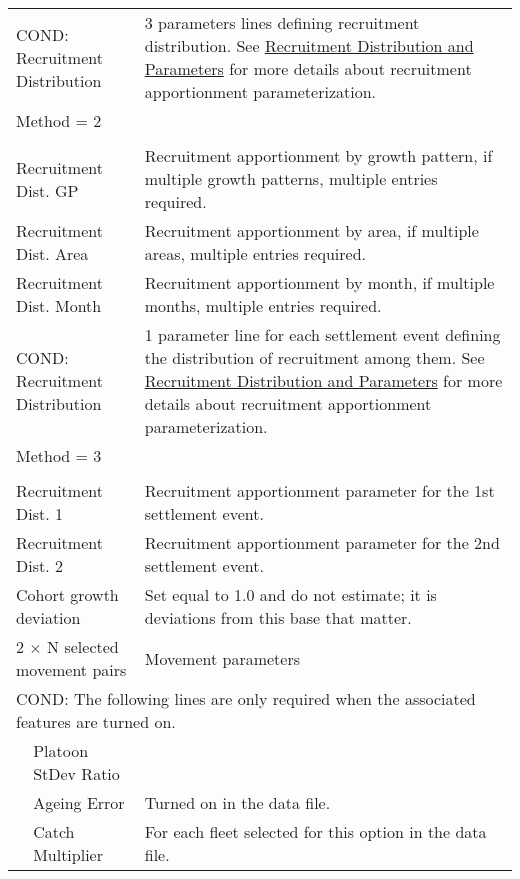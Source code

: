 \begin{longtable}{p{1cm} p{2.25cm} p{10cm}}
	\multicolumn{2}{l}{COND: Recruitment Distribution} \Tstrut & 3 parameters lines defining recruitment distribution. See \hyperlink{recdist}{Recruitment Distribution and Parameters} for more details about recruitment apportionment parameterization. \\
	\multicolumn{2}{l}{Method = 2} \Tstrut & \\
	& & \\
	\multicolumn{2}{l}{Recruitment Dist. GP} \Tstrut & Recruitment apportionment by growth pattern, if multiple growth patterns, multiple entries required. \\
	\multicolumn{2}{l}{Recruitment Dist. Area} & Recruitment apportionment by area, if multiple areas, multiple entries required. \\
	\multicolumn{2}{l}{Recruitment Dist. Month} & Recruitment apportionment by month, if multiple months, multiple entries required. \Bstrut\\
	\hline

	\multicolumn{2}{l}{COND: Recruitment Distribution} \Tstrut & 1 parameter line for each settlement event defining the distribution of recruitment among them. See \hyperlink{recdist}{Recruitment Distribution and Parameters} for more details about recruitment apportionment parameterization. \\
	\multicolumn{2}{l}{Method = 3} \Tstrut & \\
	& & \\
	\multicolumn{2}{l}{Recruitment Dist. 1} \Tstrut & Recruitment apportionment parameter for the 1st settlement event. \\
	\multicolumn{2}{l}{Recruitment Dist. 2} & Recruitment apportionment parameter for the 2nd settlement event. \Bstrut\\
	\hline

	\multicolumn{2}{l}{Cohort growth deviation} \Tstrut & Set equal to 1.0 and do not estimate; it is deviations from this base that matter. \Bstrut\\
	\hline

	\multicolumn{2}{l}{2 $\times$ N selected movement pairs} & Movement parameters \Tstrut\Bstrut\\
	\hline

	\multicolumn{3}{l}{COND: The following lines are only required when the associated features are turned on.} \Tstrut\\
	& Platoon StDev Ratio & \\
	& Ageing Error & Turned on in the data file. \\
	& Catch Multiplier & For each fleet selected for this option in the data file. \\
	\hline


\end{longtable}
